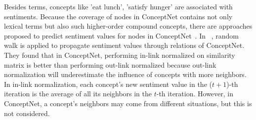 Besides terms, concepts like 'eat lunch', 'satisfy hunger' are associated with sentiments. Because the coverage of nodes in ConceptNet contains not only lexical terms but also such higher-order compound concepts, there are approaches proposed to predict sentiment values for nodes in ConceptNet~\cite{Liu:IUI03, Cambria:AAAI10, Wu:TAAI11, Tsai:IEEE13, Wu:relSelect14}. In ~\cite{Tsai:IEEE13, Wu:relSelect14}, random walk is applied to propagate sentiment values through relations of ConceptNet. They found that in ConceptNet, performing in-link normalized on similarity matrix is better than performing out-link normalized because out-link normalization will underestimate the influence of concepts with more neighbors. In in-link normalization, each concept's new sentiment value in the ($t+1$)-th iteration is the average of all its neighbors in the $t$-th iteration. However, in ConceptNet, a concept's neighbors may come from different situations, but this is not considered.


